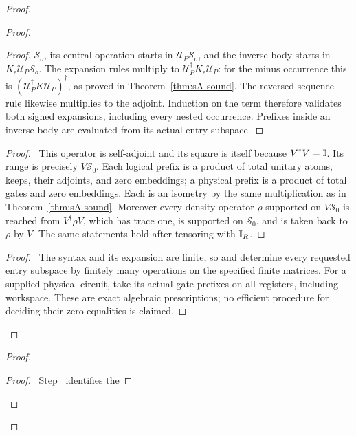 \begin{proof}
\begin{proof}
\begin{proof}
  $\mathcal S_o$, its central operation starts in
  $\mathcal U_P\mathcal S_o$, and the inverse body starts in
  $K_\epsilon\mathcal U_P\mathcal S_o$.
  The expansion rules multiply to $\mathcal U_P^\dagger
  K_\epsilon\mathcal U_P$: for the minus occurrence this is
  $(\mathcal U_P^\dagger K\mathcal U_P)^\dagger$, as proved in
  Theorem~\ref{thm:sA-sound}. The reversed sequence rule likewise
  multiplies to the adjoint. Induction on the term therefore validates
  both signed expansions, including every nested occurrence. Prefixes
  inside an inverse body are evaluated from its actual entry subspace.
  \end{proof}
  \begin{proof}\pf\ This operator is self-adjoint and its square is
  itself because $V^\dagger V=\mathbb{I}$. Its range is precisely
  $V\mathcal S_0$. Each logical prefix is a product of total unitary
  atoms, keeps, their adjoints, and zero embeddings; a physical prefix
  is a product of total gates and zero embeddings. Each is an isometry
  by the same multiplication as in Theorem~\ref{thm:sA-sound}.
  Moreover every density operator $\rho$ supported on $V\mathcal S_0$
  is reached from $V^\dagger\rho V$, which has trace one, is supported
  on $\mathcal S_0$, and is taken back to $\rho$ by $V$.
  The same statements hold after tensoring with $\mathbb{I}_R$.
  \end{proof}
  \qedstep
  \begin{proof}\pf\ The syntax and its expansion are finite, so
   and 
  determine every requested entry subspace by finitely many operations
  on the specified finite matrices. For a supplied physical circuit,
  take its actual gate prefixes on all registers, including workspace.
  These are exact algebraic prescriptions; no efficient procedure for
  deciding their zero equalities is claimed.
  \end{proof}
 \end{proof}
\begin{proof}
 \begin{proof}\pf\ Step~ identifies the

\end{proof}
\end{proof}
\end{proof}
